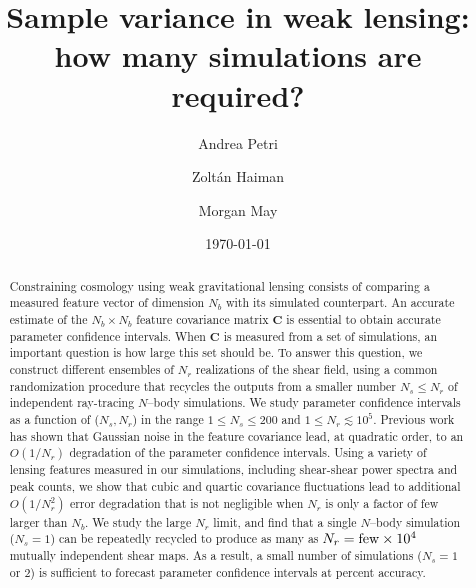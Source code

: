 \documentclass[reprint,aps,prd,superscriptaddress,showkeys,showpacs]{revtex4-1}
\newcommand{\bb}[1]{\mathbf{#1}}
\begin{document}
\title{Sample variance in weak lensing: how many simulations are required?}

\author{Andrea Petri}

\author{Zolt\'an Haiman}

\author{Morgan May}

\date{\today}

\label{firstpage}

\begin{abstract}

Constraining cosmology using weak gravitational lensing consists of
comparing a measured feature vector of dimension $N_b$ with its
simulated counterpart. An accurate estimate of the $N_b\times N_b$
feature covariance matrix $\bb{C}$ is essential to obtain accurate
parameter confidence intervals. When $\bb{C}$ is measured from a set
of simulations, an important question is how large this set should
be. To answer this question, we construct different ensembles of $N_r$
realizations of the shear field, using a common randomization
procedure that recycles the outputs from a smaller number $N_s\leq
N_r$ of independent ray-tracing $N$--body simulations.  We study
parameter confidence intervals as a function of ($N_s,N_r$) in the
range $1\leq N_s\leq 200$ and $1\leq N_r\lesssim 10^5$.  Previous work
\citep{DodelsonSchneider13} has shown that Gaussian noise in the
feature covariance lead, at quadratic order, to an $O(1/N_r)$
degradation of the parameter confidence intervals. Using a variety of
lensing features measured in our simulations, including shear-shear
power spectra and peak counts, we show that cubic and quartic
covariance fluctuations lead to additional $O(1/N_r^2)$ error
degradation that is not negligible when $N_r$ is only a factor of few
larger than $N_b$. We study the large $N_r$ limit, and find that a
single $N$--body simulation ($N_s=1$) can be repeatedly recycled to
produce as many as $N_r={\rm few}\times10^4$ mutually independent shear maps. As a
result, a small number of simulations ($N_s=1$ or $2$) is sufficient
to forecast parameter confidence intervals at percent
accuracy. 

\end{abstract}
\end{document}
